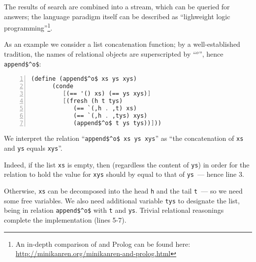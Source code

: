 The results of search are combined into a stream, which can be queried for answers; the language paradigm itself
can be described as ``lighweight logic programming''\footnote{An in-depth comparison of \miniKanren and Prolog can be found
here: \url{http://minikanren.org/minikanren-and-prolog.html}}.
 
As an example we consider a list concatenation function; by a well-established tradition, the names 
of relational objects are superscripted by ``$^o$'', hence \lstinline{append$^o$}: 

\begin{lstlisting}[mathescape=true,language=scheme,numbers=left,numberstyle=\small,stepnumber=1,numbersep=-5pt]
   (define (append$^o$ xs ys xys) 
      (conde 
         [(== '() xs) (== ys xys)]
         [(fresh (h t tys)
            (== `(,h . ,t) xs)
            (== `(,h . ,tys) xys)
            (append$^o$ t ys tys))]))
\end{lstlisting}

We interpret the relation ``\lstinline{append$^o$ xs ys xys}'' as ``the concatenation of \lstinline{xs} and \lstinline{ys} 
equals \lstinline{xys}''. 

Indeed, if the list \lstinline{xs} is empty, then (regardless the content of \lstinline{ys}) in order for the relation to hold 
the value for \lstinline{xys} should by equal to that of \lstinline{ys}~--- hence line 3. 

Otherwise, \lstinline{xs} can be decomposed into the head \lstinline{h} and the tail \lstinline{t}~--- so we need some free variables. We also
need additional variable \lstinline{tys} to designate the list, being in relation \lstinline{append$^o$} with \lstinline{t} and \lstinline{ys}.
Trivial relational reasonings complete the implementation (lines 5-7).

